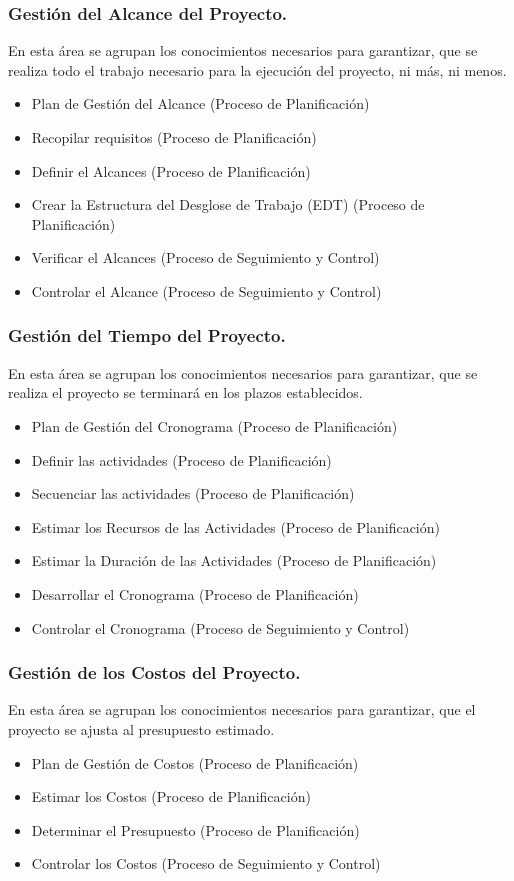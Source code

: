 \documentclass[12pt]{beamer}
\begin{document}
\begin{frame}
 \frametitle{Gestión del Alcance del Proyecto.}
 En esta área se agrupan los conocimientos necesarios para garantizar, que se realiza todo el trabajo necesario para la ejecución del proyecto, ni más, ni menos.
 \begin{itemize}
  \item<2-> Plan de Gestión del Alcance (Proceso de Planificación)
  \item<2-> Recopilar requisitos (Proceso de Planificación)
  \item<3-> Definir el Alcances (Proceso de Planificación)
  \item<4-> Crear la Estructura del Desglose de Trabajo (EDT) (Proceso de Planificación)
  \item<5-> Verificar el Alcances (Proceso de Seguimiento y Control)
  \item<6-> Controlar el Alcance (Proceso de Seguimiento y Control)
 \end{itemize}
\end{frame}



\begin{frame}
 \frametitle{Gestión del Tiempo del Proyecto.}
 En esta área se agrupan los conocimientos necesarios para garantizar, que se realiza el proyecto se terminará en los plazos establecidos.
 \begin{itemize}
  \item<2-> Plan de Gestión del Cronograma (Proceso de Planificación)
  \item<3-> Definir las actividades (Proceso de Planificación)
  \item<4-> Secuenciar las actividades (Proceso de Planificación)
  \item<5-> Estimar los Recursos de las Actividades (Proceso de Planificación)
  \item<6-> Estimar la Duración de las Actividades (Proceso de Planificación)
  \item<7-> Desarrollar el Cronograma (Proceso de Planificación)
  \item<8-> Controlar el Cronograma (Proceso de Seguimiento y Control)
 \end{itemize}
\end{frame}



\begin{frame}
 \frametitle{Gestión de los Costos del Proyecto.}
 En esta área se agrupan los conocimientos necesarios para garantizar, que el proyecto se ajusta al presupuesto estimado.
 \begin{itemize}
  \item<2-> Plan de Gestión de Costos (Proceso de Planificación)
  \item<3-> Estimar los Costos (Proceso de Planificación)
  \item<4-> Determinar el Presupuesto (Proceso de Planificación)
  \item<5-> Controlar los Costos (Proceso de Seguimiento y Control)
 \end{itemize}
\end{frame}
\end{document}
